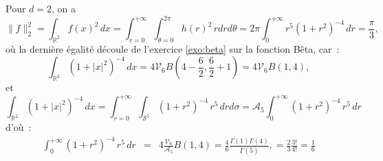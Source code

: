 {\begin{enumerate}
{Pour $d = 2$, on a
$$
\|f\|_{2}^2 = \int_{\mathbb{R}^2} f(x)^2\,dx =
\int_{r=0}^{+\infty}\int_{\theta=0}^{2\pi} h(r)^2 \,r dr d\theta =
2\pi \int_{0}^{+\infty} r^5 (1+r^2)^{-4}\,dr = \frac{\pi}{3},
$$
o\`u la derni\`ere \'egalit\'e d\'ecoule de l'exercice \ref{exo:beta} sur la fonction Bêta, car~:
$$
\int_{\mathbb{R}^2} (1 + |x|^2)^{-4}\,dx = 4\mathcal{V}_{6}
B\left(4 - \frac{6}{2}, \frac{6}{2} + 1\right) = 4 \mathcal{V}_{6}
B\left(1, 4\right),
$$
et
$$
\int_{\mathbb{R}^2} (1 + |x|^2)^{-4}\,dx = \int_{r =
0}^{+\infty}\int_{\mathcal{S}^5} (1 + r^{2})^{-4}\, r^5 \,dr
d\sigma = \mathcal{A}_{5} \int_{0}^{+\infty} (1 + r^{2})^{-4}\,
r^5 \,dr
$$
d'o\`u~:
$$
\begin{array}{lcl}
\int_{0}^{+\infty} (1 + r^{2})^{-4}\, r^5 \,dr  & =&  4
\frac{\mathcal{V}_{6}}{\mathcal{A}_5} B\left(1, 4\right) =
\frac{4}{6} \frac{\Gamma(1)\Gamma(4)}{\Gamma(5)},
 =
\frac{2}{3}\frac{3!}{4!} = \frac{1}{6}
\end{array}
$$}
\end{enumerate}
}